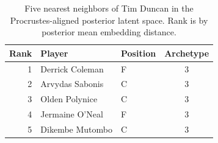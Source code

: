 \begin{table}[htbp]
  \centering\small
  \begin{tabular}{rllc}
    \toprule
    Rank & Player & Position & Archetype \\
    \midrule
    1 & Derrick Coleman & F & 3 \\
    2 & Arvydas Sabonis & C & 3 \\
    3 & Olden Polynice & C & 3 \\
    4 & Jermaine O'Neal & F & 3 \\
    5 & Dikembe Mutombo & C & 3 \\
    \bottomrule
  \end{tabular}
  \caption{Five nearest neighbors of Tim Duncan in the Procrustes-aligned posterior latent space. Rank is by posterior mean embedding distance.}
  \label{tab:Tim_Duncan_neighbors}
\end{table}

